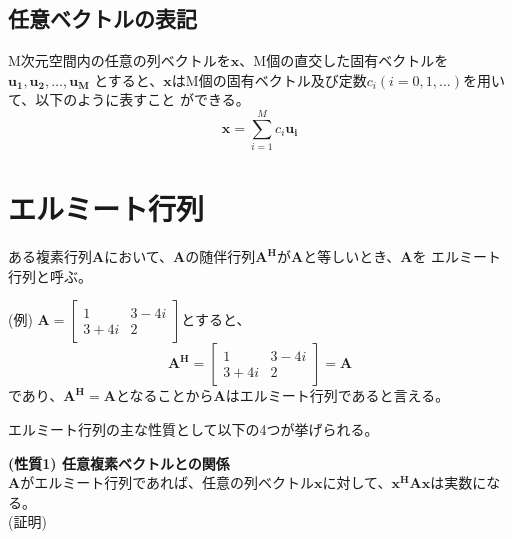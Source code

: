 \subsection{任意ベクトルの表記}
M次元空間内の任意の列ベクトルを$\bm{x}$、M個の直交した固有ベクトルを$\bm{u_1},\bm{u_2},\ldots,\bm{u_M}$
とすると、$\bm{x}$はM個の固有ベクトル及び定数$c_i(i=0,1,\ldots)$を用いて、以下のように表すこと
ができる。
\begin{equation}
    \bm{x} = \sum_{i=1}^M c_i\bm{u_i}
\end{equation}

\section{エルミート行列}
ある複素行列$\bm{A}$において、$\bm{A}$の随伴行列$\bm{A^H}$が$\bm{A}$と等しいとき、$\bm{A}$を
エルミート行列と呼ぶ。

(例) \quad
$
  \bm{A} = \left[
    \begin{array}{cc}
      1 & 3-4i \\
      3+4i & 2
    \end{array}
  \right]
$とすると、
\vspace{1mm}
\begin{equation}
    \bm{A^H} = \left[
        \begin{array}{cc}
            1 & 3-4i \\
            3+4i & 2
        \end{array}
    \right]
    = \bm{A} \nonumber
\end{equation}
であり、$\bm{A^H}=\bm{A}$となることから$\bm{A}$はエルミート行列であると言える。

エルミート行列の主な性質として以下の4つが挙げられる。

\vspace{5mm}
\noindent\textbf{(性質1) \quad 任意複素ベクトルとの関係} \\
$\bm{A}$がエルミート行列であれば、任意の列ベクトル$\bm{x}$に対して、$\bm{x^HAx}$は実数になる。\\
\vspace{3mm}
(証明)


